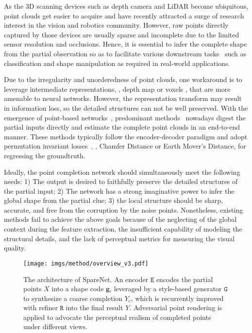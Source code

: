 \documentclass[final]{cvpr}
\begin{document}
As the 3D scanning devices such as depth camera and LiDAR become ubiquitous, point clouds get easier to acquire and have recently attracted a surge of research interest in the vision and robotics community. 
However, raw points directly captured by those devices are usually sparse and incomplete due to the limited sensor resolution and occlusions. Hence, it is essential to infer the complete shape from the partial observation so as to facilitate various downstream tasks~\cite{guo2020deep} such as classification and shape manipulation as required in real-world applications.

Due to the irregularity and unorderedness of point clouds, one workaround is to leverage intermediate representations, \eg, depth map \cite{hu2019render4completion} or voxels \cite{xie2020grnet}, that are more amenable to neural networks. However, the representation transform may result in information loss, so the detailed structures can not be well preserved. With the emergence of point-based networks~\cite{qi2017pointnet,qi2017pointnet++,thomas2019kpconv,dgcnn,guo2020deep}, predominant methods~\cite{foldingnet_2018_CVPR,Yuan-2018-pcn,atlasnet2018,wen2020point,liu2019morphing,topnet_2019_CVPR,chen2019unpaired,cascaded_2020_CVPR, pfnet_2020_CVPR, detailpreserved_eccv2020} nowadays digest the partial inputs directly and estimate the complete point clouds in an end-to-end manner. These methods typically follow the encoder-decoder paradigm and adopt permutation invariant losses~\cite{fan2017pointsetgeneration}, \eg, Chamfer Distance or Earth Mover's Distance, for regressing the groundtruth. 

Ideally, the point completion network should simultaneously meet the following needs: 1) The output is desired to faithfully preserve the detailed structures of the partial input; 2) The network has a strong imaginative power to infer the global shape from the partial clue; 3) the local structure should be sharp, accurate, and free from the corruption by the noise points. Nonetheless, existing methods fail to achieve the above goals because of the neglecting of the global context during the feature extraction, the insufficient capability of modeling the structural details, and the lack of perceptual metrics for measuring the visual quality. 


\begin{figure*}[t]
\centering
 \texttt{[image: imgs/method/overview\_v3.pdf]}
 \footnotesize
    \caption{
    The architecture of SpareNet. An encoder $\mathtt{E}$ encodes the partial points $X$ into a shape code $\mathbf{g}$, leveraged by a style-based generator $\texttt{G}$ to synthesize a coarse completion $Y_c$, which is recurrently improved with refiner $\texttt{R}$ into the final result $Y$. Adversarial point rendering is applied to advocate the perceptual realism of completed points under different views.
    }
\label{fig:overview}
\vspace{-1em}
\end{figure*}
\end{document}
